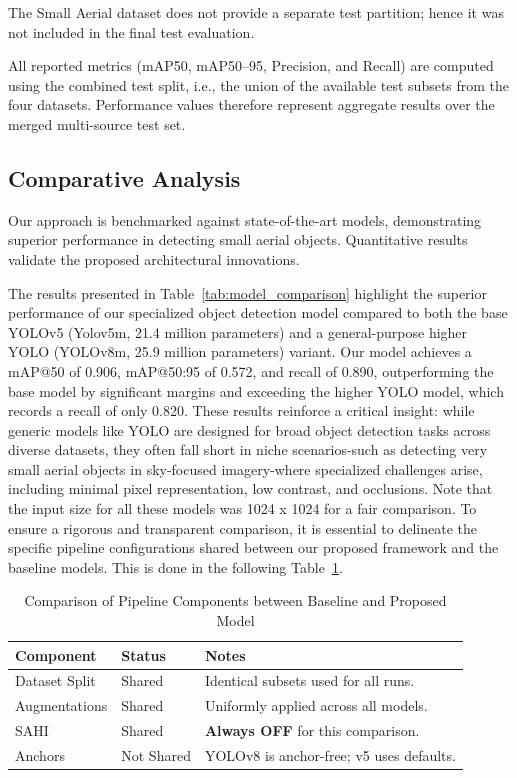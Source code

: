\documentclass[preprint,review,12pt]{elsarticle}
\begin{document}
\begin{highlightbox}
The Small Aerial dataset does not provide a separate test partition; hence it was not included in the final test evaluation.

All reported metrics (mAP50, mAP50--95, Precision, and Recall) are computed using the combined test split, i.e., the union of the available test subsets from the four datasets. Performance values therefore represent aggregate results over the merged multi-source test set.
\end{highlightbox}

\subsection{Comparative Analysis}
Our approach is benchmarked against state-of-the-art models, demonstrating superior performance in detecting small aerial objects. Quantitative results validate the proposed architectural innovations.

The results presented in Table~\ref{tab:model_comparison} highlight the superior performance of our specialized object detection model compared to both the base YOLOv5 (Yolov5m,  21.4 million parameters) and a general-purpose higher YOLO (YOLOv8m, 25.9 million parameters) variant. Our model achieves a mAP@50 of 0.906, mAP@50:95 of 0.572, and recall of 0.890, outperforming the base model by significant margins and exceeding the higher YOLO model, which records a recall of only 0.820. These results reinforce a critical insight: while generic models like YOLO are designed for broad object detection tasks across diverse datasets, they often fall short in niche scenarios-such as detecting very small aerial objects in sky-focused imagery-where specialized challenges arise, including minimal pixel representation, low contrast, and occlusions. Note that the input size for all these models was 1024 x 1024 for a fair comparison. To ensure a rigorous and transparent comparison, it is essential to delineate the specific pipeline configurations shared between our proposed framework and the baseline models. This is done in the following Table~\ref{components}. 

\begin{table}[h]
\centering
\caption{Comparison of Pipeline Components between Baseline and Proposed Model}
\label{tab:pipeline_comparison}
\begin{tabular}{lll}
\hline
\textbf{Component} & \textbf{Status} & \textbf{Notes} \\ \hline
Dataset Split & Shared & Identical subsets used for all runs. \\
Augmentations & Shared & Uniformly applied across all models. \\
SAHI & Shared & \textbf{Always OFF} for this comparison. \\
Anchors & Not Shared & YOLOv8 is anchor-free; v5 uses defaults. \\ \hline
\end{tabular}
\label{components}
\end{table}
\end{document}
